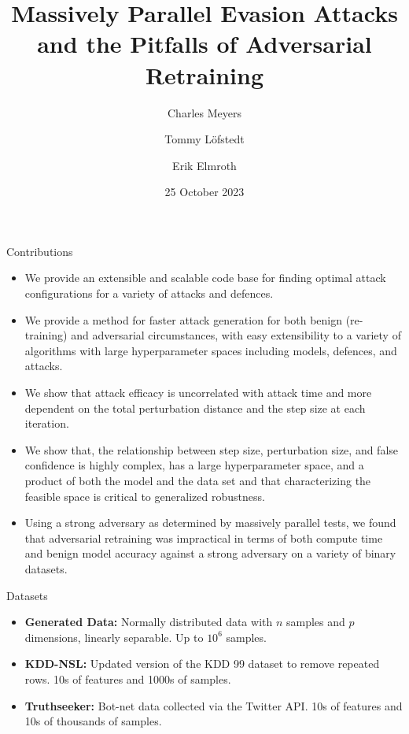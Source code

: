 \documentclass{beamer}
\title{Massively Parallel Evasion Attacks and the Pitfalls of Adversarial Retraining}
\author{Charles Meyers\inst{1} \and
Tommy L\"{o}fstedt\inst{2}  \and
Erik Elmroth\inst{3} }
\institute{ 
Department of Computing Science, Umeå University, Umeå, Sweden \email{cmeyers@cs.umu.se} \and 
\email{tommy@cs.umu.se} \and 
\email{eriks@cs.umu.se}
}
\date{25 October 2023}
\begin{document}
\frame{\titlepage}
\begin{frame}{Contributions}
    \begin{itemize}
    \small
    \item We provide an extensible and scalable code base for finding optimal attack configurations for a variety of attacks and defences.

    \item  We provide a method for faster attack generation for both benign (re-training) and adversarial circumstances, with easy extensibility to a variety of algorithms with large hyperparameter spaces including  models, defences, and attacks.
    
    \item We show that attack efficacy is uncorrelated with attack time and more dependent on the total perturbation distance and the step size at each iteration.

    \item We show that, the relationship between step size, perturbation size, and false confidence is highly complex, has a large hyperparameter space, and a product of both the model and the data set and that characterizing the feasible space is critical to generalized robustness.

    \item Using a strong adversary as determined by massively parallel tests, we found that adversarial retraining was impractical in terms of both compute time and benign model accuracy against a strong adversary on a variety of binary datasets.
    
\end{itemize}
\end{frame}
\begin{frame}{Datasets}
    \begin{itemize}
        \item \textbf{Generated Data:} Normally distributed data with $n$ samples and $p$ dimensions, linearly separable. Up to $10^6$ samples.
        \item \textbf{KDD-NSL:} Updated version of the KDD 99 dataset to remove repeated rows. 10s of features and 1000s of samples. \cite{kdd-nsl}
        \item \textbf{Truthseeker:} Bot-net data collected via the Twitter API. 10s of features and 10s of thousands of samples. \cite{truthseeker}
        
    \end{itemize}
\end{frame}
\end{document}
